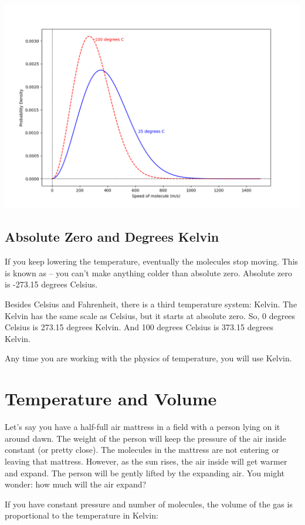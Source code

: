 \includegraphics[width=\textwidth]{ar2_plot.png}

\subsection{Absolute Zero and Degrees Kelvin}

If you keep lowering the temperature,  eventually the molecules stop moving.  This is known as  -- you
 can't make anything colder than absolute zero.   Absolute zero is -273.15 degrees Celsius.
 
Besides Celsius and Fahrenheit, there is a third temperature system: Kelvin.  The Kelvin has the same scale as Celsius, but it starts at absolute zero.   
So,  0 degrees Celsius is 273.15 degrees Kelvin.    And 100 degrees Celsius is 373.15 degrees Kelvin.

Any time you are working with the physics of temperature, you will use Kelvin.

\section{Temperature and Volume}

Let's say you have a half-full air mattress in a field with a person lying on it around dawn.   The weight of the person will keep the pressure of the air inside constant (or pretty close).  
The molecules in the mattress are not entering or leaving that mattress.  However, as the sun rises,  the air inside will get warmer and expand.  The person will be gently lifted by the expanding air.  You might wonder: how much will the air expand?

If you have constant pressure and number of molecules,  the volume of the gas is proportional to the temperature in Kelvin:

